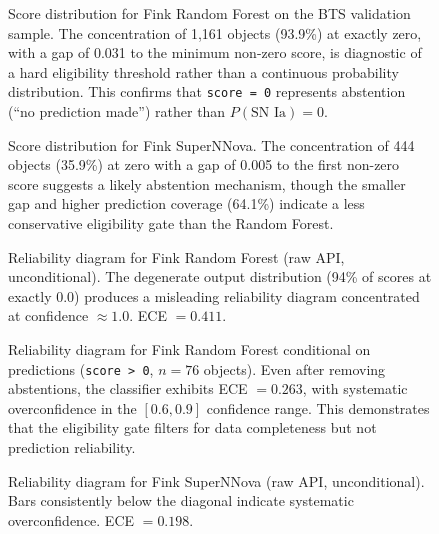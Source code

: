 \documentclass[twocolumn]{aastex631}
\begin{document}
\begin{figure}
\caption{Score distribution for Fink Random Forest on the BTS validation sample. The concentration of 1,161 objects (93.9\%) at exactly zero, with a gap of 0.031 to the minimum non-zero score, is diagnostic of a hard eligibility threshold rather than a continuous probability distribution. This confirms that \texttt{score = 0} represents abstention (``no prediction made'') rather than $P(\text{SN~Ia}) = 0$. \label{fig:fink_rf_histogram}}
\end{figure}

\begin{figure}
\caption{Score distribution for Fink SuperNNova. The concentration of 444 objects (35.9\%) at zero with a gap of 0.005 to the first non-zero score suggests a likely abstention mechanism, though the smaller gap and higher prediction coverage (64.1\%) indicate a less conservative eligibility gate than the Random Forest. \label{fig:fink_snn_histogram}}
\end{figure}

\begin{figure}
\caption{Reliability diagram for Fink Random Forest (raw API, unconditional). The degenerate output distribution (94\% of scores at exactly 0.0) produces a misleading reliability diagram concentrated at confidence $\approx 1.0$. ECE $= 0.411$. \label{fig:fink_rf_raw}}
\end{figure}

\begin{figure}
\caption{Reliability diagram for Fink Random Forest conditional on predictions (\texttt{score > 0}, $n = 76$ objects). Even after removing abstentions, the classifier exhibits ECE $= 0.263$, with systematic overconfidence in the $[0.6, 0.9]$ confidence range. This demonstrates that the eligibility gate filters for data completeness but not prediction reliability. \label{fig:fink_rf_conditional}}
\end{figure}

\begin{figure}
\caption{Reliability diagram for Fink SuperNNova (raw API, unconditional). Bars consistently below the diagonal indicate systematic overconfidence. ECE $= 0.198$. \label{fig:fink_snn_raw}}
\end{figure}
\end{document}
